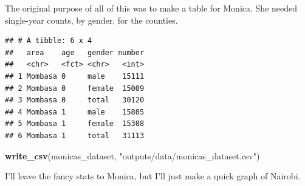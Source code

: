 \documentclass[
]{book}
\newenvironment{Shaded}{\begin{snugshade}}{\end{snugshade}}
\newcommand{\KeywordTok}[1]{\textcolor[rgb]{0.13,0.29,0.53}{\textbf{#1}}}
\newcommand{\NormalTok}[1]{#1}
\newcommand{\OperatorTok}[1]{\textcolor[rgb]{0.81,0.36,0.00}{\textbf{#1}}}
\newcommand{\StringTok}[1]{\textcolor[rgb]{0.31,0.60,0.02}{#1}}
\begin{document}
The original purpose of all of this was to make a table for Monica. She needed single-year counts, by gender, for the counties.

\begin{Shaded}
\end{Shaded}

\begin{verbatim}
## # A tibble: 6 x 4
##   area    age   gender number
##   <chr>   <fct> <chr>   <int>
## 1 Mombasa 0     male    15111
## 2 Mombasa 0     female  15009
## 3 Mombasa 0     total   30120
## 4 Mombasa 1     male    15805
## 5 Mombasa 1     female  15308
## 6 Mombasa 1     total   31113
\end{verbatim}

\begin{Shaded}
\begin{Highlighting}[]
\KeywordTok{write_csv}\NormalTok{(monicas_dataset, }\StringTok{"outputs/data/monicas_dataset.csv"}\NormalTok{)}
\end{Highlighting}
\end{Shaded}

I'll leave the fancy stats to Monica, but I'll just make a quick graph of Nairobi.
\end{document}
